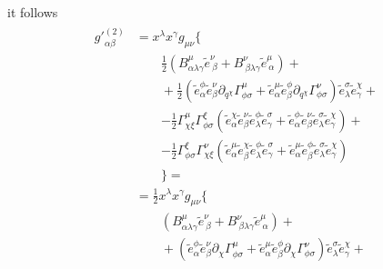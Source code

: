 \documentclass[letterpaper,10pt,english]{jupyterBook}
\begin{document}
\sphinxAtStartPar
it follows
\begin{equation}\label{equation:ch/relativity-general/local-inertial-reference-frame-and-equivalence-principle:eq:local-inertial:metric:second-order:1}
\begin{split}\begin{aligned}
 {g'}^{(2)}_{\alpha \beta} 
 & = x^\lambda x^\gamma g_{\mu \nu}
 \Big\{ \\
  & \qquad \left. \frac{1}{2} \left( B^{\mu}_{\alpha \lambda \gamma} \widetilde{e}^{\nu}_{\ \beta} + B^{\nu}_{\ \beta \lambda \gamma} \widetilde{e}^{\mu}_{\ \alpha} \right) 
 \right. + \\
 & \qquad + \left.
   \frac{1}{2} 
     \left( \widetilde{e}^{\phi}_{\alpha} \widetilde{e}^{\nu}_{\beta} \partial_{q^\chi} \Gamma^{\mu}_{\phi \sigma} 
     + \widetilde{e}^{\mu}_{\alpha} \widetilde{e}^{\phi}_{\beta}  \partial_{q^\chi} \Gamma^{\nu}_{\phi \sigma}
     \right) \widetilde{e}^{\sigma}_{\lambda} \widetilde{e}^{\chi}_{\gamma} 
  \right. + \\
 & \qquad \left.
   - \frac{1}{2} \Gamma^{\mu}_{\chi \xi} \Gamma^{\xi}_{\phi \sigma} \left( 
    \widetilde{e}^{\chi}_{\alpha} \widetilde{e}^{\nu}_{\beta}  \widetilde{e}^{\phi}_{\lambda} \widetilde{e}^{\sigma}_{\gamma}  
  + \widetilde{e}^{\phi}_{\alpha } \widetilde{e}^{\nu}_{\beta} \widetilde{e}^{\sigma}_{\lambda} \widetilde{e}^{\chi}_{\gamma}  \right) 
 \right. + \\
  & \qquad \left.
  - \frac{1}{2} \Gamma^{\xi}_{\phi \sigma} \Gamma^{\nu}_{\chi \xi} \left( 
     \widetilde{e}^{\mu}_{\alpha} \widetilde{e}^{\chi}_{\beta}  \widetilde{e}^{\phi}_{\lambda} \widetilde{e}^{\sigma}_{\gamma} + 
     \widetilde{e}^{\mu}_{\alpha} \widetilde{e}^{\phi}_{\beta  } \widetilde{e}^{\sigma}_{\lambda} \widetilde{e}^{\chi}_{\gamma} \right) \right. \\
 & \qquad \Big\} = \\
 & = \frac{1}{2} x^\lambda x^\gamma g_{\mu \nu}
 \Big\{ \\
  & \qquad \left. \left( B^{\mu}_{\alpha \lambda \gamma} \widetilde{e}^{\nu}_{\ \beta} + B^{\nu}_{\ \beta \lambda \gamma} \widetilde{e}^{\mu}_{\ \alpha} \right) 
 \right. + \\
 & \qquad + \left.
     \left( \widetilde{e}^{\phi}_{\alpha} \widetilde{e}^{\nu}_{\beta} \partial_{\chi} \Gamma^{\mu}_{\phi \sigma} 
     + \widetilde{e}^{\mu}_{\alpha} \widetilde{e}^{\phi}_{\beta}  \partial_{\chi} \Gamma^{\nu}_{\phi \sigma}
     \right) \widetilde{e}^{\sigma}_{\lambda} \widetilde{e}^{\chi}_{\gamma} 
  \right. + \\

\end{aligned}
\end{split}
\end{equation}
\end{document}
